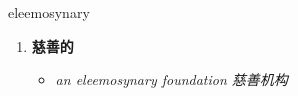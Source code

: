 
\begin{frame}
{\huge eleemosynary}
\begin{center}
\begin{enumerate}\Large
  \item \textbf{慈善的}
  \begin{itemize}
    \item \em{\Large{an eleemosynary foundation 慈善机构}}
  \end{itemize}
\end{enumerate}
\end{center}
\end{frame}

